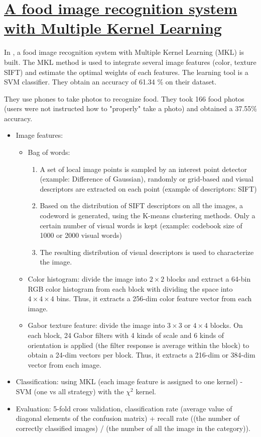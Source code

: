 \section{\href{http://ieeexplore.ieee.org/lpdocs/epic03/wrapper.htm?arnumber=5413400}{A food image recognition system with Multiple Kernel Learning}}

In \cite{TaichiJoutou2009}, a food image recognition system with Multiple Kernel Learning (MKL) is built. The MKL method is used to integrate several image features (color, texture SIFT) and estimate the optimal weights of each features. The learning tool is a SVM classifier.
They obtain an accuracy of 61.34 \% on their dataset.

They use phones to take photos to recognize food. They took 166 food photos (users were not instructed how to "properly" take a photo) and obtained a 37.55\% accuracy.

\begin{itemize}
    \item Image features:
    \begin{itemize}
        \item Bag of words:
        \begin{enumerate}
            \item A set of local image points is sampled by an interest point detector (example: Difference of Gaussian), randomly or grid-based and visual descriptors are extracted on each point (example of descriptors: SIFT)
            \item Based on the distribution of SIFT descriptors on all the images, a codeword is generated, using the K-means clustering methods. Only a certain number of visual words is kept (example: codebook size of 1000 or 2000 visual words)
            \item The resulting distribution of visual descriptors is used to characterize the image.
        \end{enumerate}
        \item Color histogram: divide the image into $2 \times 2$ blocks and extract a 64-bin RGB color histogram from each block with dividing the space into $4 \times 4 \times 4$ bins. Thus, it extracts a 256-dim color feature vector from each image.
        \item Gabor texture feature: divide the image into $3 \times 3$ or $4 \times 4$ blocks. On each block, 24 Gabor filters with 4 kinds of scale and 6 kinds of orientation is applied (the filter response is average within the block) to obtain a 24-dim vectors per block. Thus, it extracts a 216-dim or 384-dim vector from each image.
    \end{itemize}
    \item Classification: using MKL (each image feature is assigned to one kernel) - SVM (one vs all strategy) with the $\chi^2$ kernel.
    
    \item Evaluation: 5-fold cross validation, classification rate (average value of diagonal elements of the confusion matrix) + recall rate ((the number of correctly classified images) / (the number of all the image in the category)).
\end{itemize}

